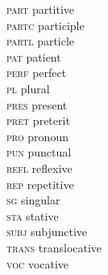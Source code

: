 \begin{multicols}{2}
\begin{tabbing}
\textsc{part}  \>    partitive\\
\textsc{partc} \>   participle\\
\textsc{partl} \>   particle\\
\textsc{pat}   \>   patient\\
\textsc{perf}  \>  perfect\\
\textsc{pl}    \>  plural\\
\textsc{pres}  \>   present\\
\textsc{pret}  \>  preterit\\
\textsc{pro}   \>   pronoun\\
\textsc{pun}   \>   punctual\\
\textsc{refl}  \>  reflexive\\
\textsc{rep}   \>     repetitive\\
\textsc{sg}    \>  singular\\
\textsc{sta}   \>   stative\\
\textsc{subj}  \>    subjunctive\\
\textsc{trans} \>   translocative\\
\textsc{voc}   \>   vocative
\end{tabbing}
\end{multicols}
